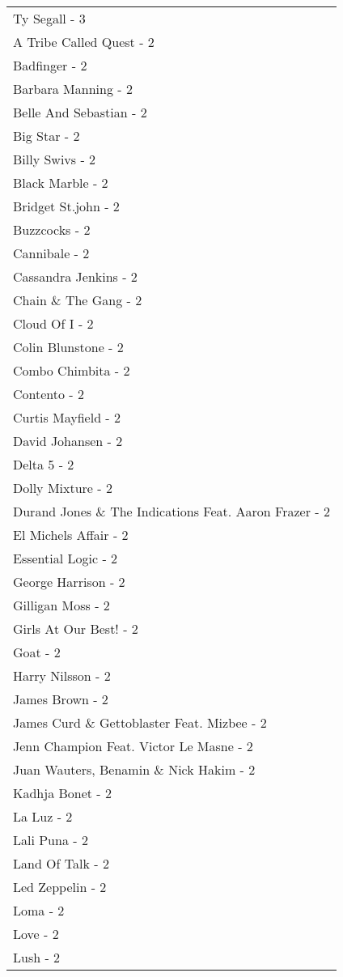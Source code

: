 \documentclass[
]{article}
\begin{document}
\begin{longtable}{l}
Ty Segall - 3 \\ 
A Tribe Called Quest - 2 \\ 
Badfinger - 2 \\ 
Barbara Manning - 2 \\ 
Belle And Sebastian - 2 \\ 
Big Star - 2 \\ 
Billy Swivs - 2 \\ 
Black Marble - 2 \\ 
Bridget St.john - 2 \\ 
Buzzcocks - 2 \\ 
Cannibale - 2 \\ 
Cassandra Jenkins - 2 \\ 
Chain \& The Gang - 2 \\ 
Cloud Of I - 2 \\ 
Colin Blunstone - 2 \\ 
Combo Chimbita - 2 \\ 
Contento - 2 \\ 
Curtis Mayfield - 2 \\ 
David Johansen - 2 \\ 
Delta 5 - 2 \\ 
Dolly Mixture - 2 \\ 
Durand Jones \& The Indications Feat. Aaron Frazer - 2 \\ 
El Michels Affair - 2 \\ 
Essential Logic - 2 \\ 
George Harrison - 2 \\ 
Gilligan Moss - 2 \\ 
Girls At Our Best! - 2 \\ 
Goat - 2 \\ 
Harry Nilsson - 2 \\ 
James Brown - 2 \\ 
James Curd \& Gettoblaster Feat. Mizbee - 2 \\ 
Jenn Champion Feat. Victor Le Masne - 2 \\ 
Juan Wauters, Benamin \& Nick Hakim - 2 \\ 
Kadhja Bonet - 2 \\ 
La Luz - 2 \\ 
Lali Puna - 2 \\ 
Land Of Talk - 2 \\ 
Led Zeppelin - 2 \\ 
Loma - 2 \\ 
Love - 2 \\ 
Lush - 2 \\ 

\end{longtable}
\end{document}
